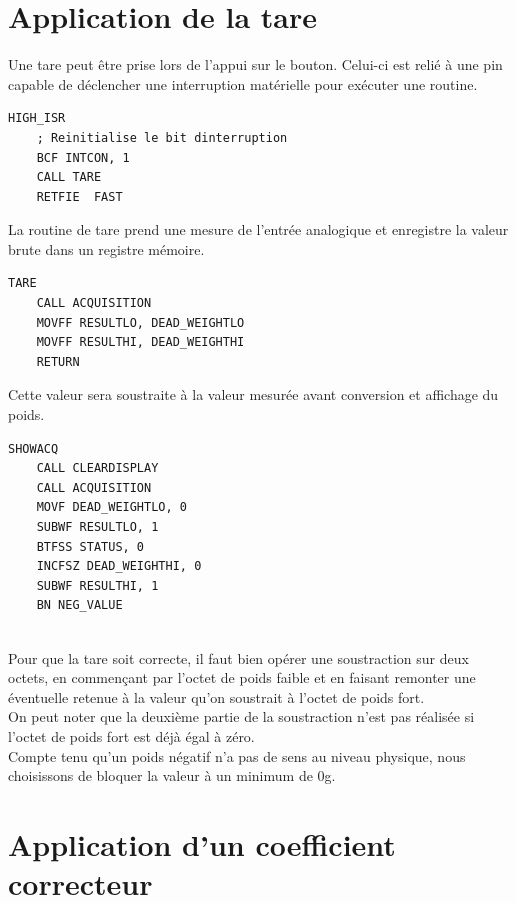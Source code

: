 \documentclass[a4paper,11pt,titlepage]{article}
\begin{document}
\section{Application de la tare}

Une tare peut être prise lors de l'appui sur le bouton. Celui-ci est relié à une pin capable de déclencher une interruption matérielle pour exécuter une routine.\\

\begin{lstlisting}
HIGH_ISR
    ; Reinitialise le bit dinterruption
    BCF INTCON, 1
    CALL TARE
    RETFIE  FAST
\end{lstlisting}

La routine de tare prend une mesure de l'entrée analogique et enregistre la valeur brute dans un registre mémoire.\\

\begin{lstlisting}
TARE
    CALL ACQUISITION
    MOVFF RESULTLO, DEAD_WEIGHTLO
    MOVFF RESULTHI, DEAD_WEIGHTHI
    RETURN
\end{lstlisting}

Cette valeur sera soustraite à la valeur mesurée avant conversion et affichage du poids.\\

\begin{lstlisting}
SHOWACQ
    CALL CLEARDISPLAY
    CALL ACQUISITION      
    MOVF DEAD_WEIGHTLO, 0		   
    SUBWF RESULTLO, 1
    BTFSS STATUS, 0		          
    INCFSZ DEAD_WEIGHTHI, 0	   
    SUBWF RESULTHI, 1		        
    BN NEG_VALUE		    
    
\end{lstlisting}

Pour que la tare soit correcte, il faut bien opérer une soustraction sur deux octets, en commençant par l'octet de poids faible et en faisant remonter une éventuelle retenue à la valeur qu'on soustrait à l'octet de poids fort.\\

On peut noter que la deuxième partie de la soustraction n'est pas réalisée si l'octet de poids fort est déjà égal à zéro.\\

Compte tenu qu'un poids négatif n'a pas de sens au niveau physique, nous choisissons de bloquer la valeur à un minimum de 0g.

\section{Application d'un coefficient correcteur}
\end{document}
